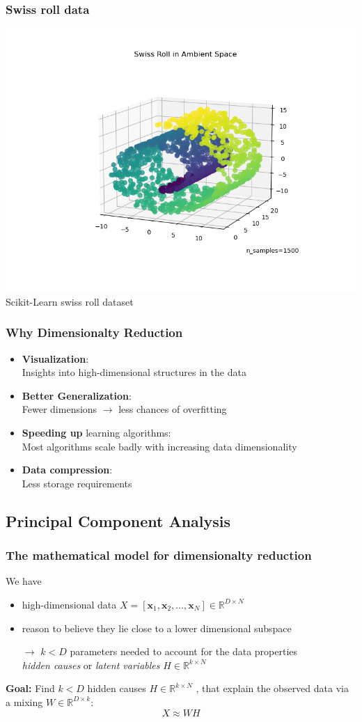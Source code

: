 \documentclass[Nike]{tuberlinbeamer}
\newcommand{\R}{\ensuremath{\mathds{R}}}
\newcommand{\bx}{{\mathbf x}}
\begin{document}
\begin{frame}\frametitle{Swiss roll data}
\centering
\includegraphics[width=.8\textwidth]{swiss_roll_sklearn}\\
\tiny Scikit-Learn swiss roll dataset
\end{frame}

\begin{frame}\frametitle{Why Dimensionalty Reduction}
\begin{itemize}
\item \textbf{Visualization}:  \\ Insights into high-dimensional structures in the data
\item \textbf{Better Generalization}: \\ Fewer dimensions $\rightarrow$ less chances of overfitting
\item \textbf{Speeding up} learning algorithms: \\
Most algorithms scale badly with increasing data dimensionality
\item \textbf{Data compression}: \\
Less storage requirements
\end{itemize}
\end{frame}

\subsection{Principal Component Analysis}
\begin{frame}\frametitle{The mathematical model for dimensionalty reduction}
We have
\begin{itemize}
\item high-dimensional data $X=[\bx_1,\bx_2,\dots,\bx_N]\in\R^{D\times N}$
\item reason to believe they lie close to a lower dimensional subspace
\item[$\rightarrow$] $k < D$ parameters needed to account for the data properties \\
{\em hidden causes} or {\em latent variables}  $H \in \R^{k \times N}$
\end{itemize}
\vspace{1em} \pause
\textbf{Goal:}  Find $k < D$  hidden causes  $H \in \R^{k \times N}$ , that explain the observed data via a mixing $W \in \R^{D \times k}$:
\[ X \approx W H\]
\end{frame}
\end{document}
